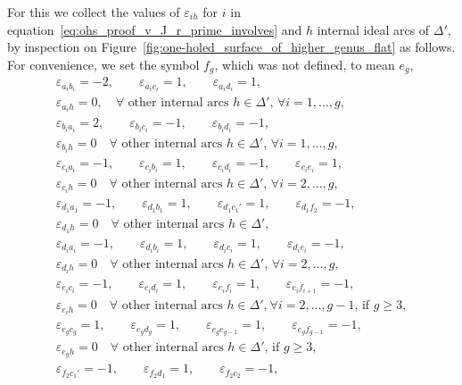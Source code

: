 \documentclass[10pt,a4paper]{amsart}
\numberwithin{equation}{section}
\theoremstyle{definition}
\begin{document}
For this we collect the values of $\varepsilon_{ih}$ for $i$ in equation~\eqref{eq:ohs_proof_v_J_r_prime_involves} and $h$ internal ideal arcs of $\Delta'$, by inspection on Figure~\ref{fig:one-holed_surface_of_higher_genus_flat} as follows. For convenience, we set the symbol $f_g$, which was not defined, to mean $e_g$,
\begin{gather*}
\varepsilon_{a_i b_i} =-2, \qquad
\varepsilon_{a_i c_i} = 1, \qquad
\varepsilon_{a_i d_i} = 1, \\
\varepsilon_{a_i h}=0, \quad\mbox{$\forall$ other internal arcs $h\in \Delta'$, $\forall i=1,\dots,g$}, \\
 \varepsilon_{b_i a_i} =2, \qquad
\varepsilon_{b_i c_i} = -1, \qquad
\varepsilon_{b_i d_i}=-1,\\
\varepsilon_{b_i h}=0 \quad\mbox{$\forall$ other internal arcs $h\in \Delta'$, $\forall i=1,\dots,g$}, \\
 \varepsilon_{c_i a_i} = -1, \qquad
\varepsilon_{c_i b_i} = 1, \qquad
\varepsilon_{c_i d_i} = -1, \qquad
\varepsilon_{c_i e_i} = 1, \\
\varepsilon_{c_i h}=0 \quad \mbox{$\forall$ other internal arcs $h\in \Delta'$, $\forall i=2,\dots,g$}, \\
 \varepsilon_{d_1 a_1} = -1,\qquad
\varepsilon_{d_1 b_1}=1,\qquad
\varepsilon_{d_1 c_1'}=1,\qquad
\varepsilon_{d_1 f_2}=-1,\\
\varepsilon_{d_1 h}=0 \quad \mbox{$\forall$ other internal arcs $h\in \Delta'$}, \\
 \varepsilon_{d_i a_i}=-1,\qquad
\varepsilon_{d_i b_i}=1,\qquad
\varepsilon_{d_i c_i}=1,\qquad
\varepsilon_{d_i e_i}=-1,\\
\varepsilon_{d_i h}=0 \quad \mbox{$\forall$ other internal arcs $h\in \Delta'$, $\forall i=2,\dots,g$}, \\
 \varepsilon_{e_i c_i}=-1,\qquad
\varepsilon_{e_i d_i}=1,\qquad
\varepsilon_{e_i f_i}=1,\qquad
\varepsilon_{e_i f_{i+1}}=-1,\\
\varepsilon_{e_i h}=0 \quad \mbox{$\forall$ other internal arcs $h\in \Delta'$,} \
 \mbox{$\forall i=2,\dots,g-1$, if $g\ge 3$}, \\
 \varepsilon_{e_g c_g}=1,\qquad
\varepsilon_{e_g d_g}=1,\qquad
\varepsilon_{e_g e_{g-1}}=1,\qquad
\varepsilon_{e_g f_{g-1}}=-1,\\
\varepsilon_{e_g h}=0\quad \mbox{$\forall$ other internal arcs $h\in \Delta'$, if $g\ge 3$}, \\
 \varepsilon_{f_2 c_1'}=-1,\qquad
\varepsilon_{f_2 d_1}=1,\qquad
\varepsilon_{f_2 c_2}=-1,\qquad

\end{gather*}
\end{document}

